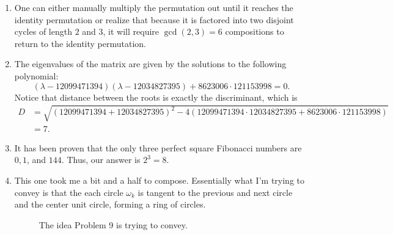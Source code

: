 \begin{enumerate}
    \item One can either manually multiply the permutation out until it reaches
        the identity permutation or realize that because it is factored into
        two disjoint cycles of length \( 2 \) and \( 3 \), it will require \(
        \gcd{\left( 2, 3 \right)} = \boxed{6} \) compositions to return to the identity
        permutation.

    \item The eigenvalues of the matrix are given by the solutions to the following polynomial:
        \[
            \left( \lambda - 12099471394 \right) \left( \lambda - 12034827395 \right) + 8623006 \cdot 121153998 = 0
        .\]
        Notice that distance between the roots is exactly the discriminant, which is
        \begin{align*}
            D &= \sqrt{\left( 12099471394 + 12034827395 \right)^2 - 4 \left( 12099471394 \cdot 12034827395 + 8623006 \cdot 121153998 \right)} \\
            &= \boxed{7}
        .\end{align*}

    \item It has been proven 
        that the only three perfect square Fibonacci numbers are \( 0, 1\), and
        \( 144 \). Thus, our answer is \( 2^3 = \boxed{8} \).

    \item This one took me a bit and a half to compose.  Essentially what I'm trying to convey is
        that the each circle \( \omega_k \) is tangent to the previous and next
        circle and the center unit circle, forming a ring of circles.

    \begin{figure}
        \begin{minipage}{0.5\textwidth}
            \centering
            \caption{The idea Problem 9 is trying to convey.}
        \end{minipage}
        \begin{minipage}{0.5\textwidth}
            \centering
\end{minipage}
\end{figure}
\end{enumerate}
